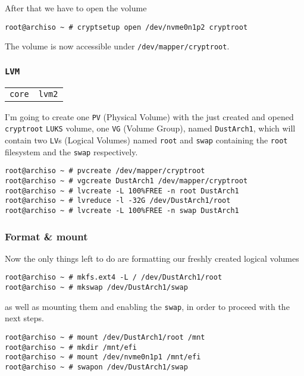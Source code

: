 \documentclass[9pt]{report}
\newenvironment{packagetable}
{\begin{longtabu}to \textwidth [b]{X[1,r]|X[1,l]}}
{\end{longtabu}}
\begin{document}
After that we have to open the volume


\begin{verbatim}
root@archiso ~ # cryptsetup open /dev/nvme0n1p2 cryptroot
\end{verbatim}

The volume is now accessible under \texttt{/dev/mapper/cryptroot}.



\newpage

\hypertarget{x-lvm}{\subsubsection{\texttt{LVM}}}
\begin{packagetable}
    \texttt{core} & \texttt{lvm2} \\ 
\end{packagetable}

I’m going to create one \texttt{PV} (Physical Volume) with the just created and opened \texttt{cryptroot} \texttt{LUKS} volume, one \texttt{VG} (Volume Group), named \texttt{DustArch1}, which will contain two \texttt{LV}s (Logical Volumes) named \texttt{root} and \texttt{swap} containing the \texttt{root} filesystem and the \texttt{swap} respectively.


\begin{verbatim}
root@archiso ~ # pvcreate /dev/mapper/cryptroot
root@archiso ~ # vgcreate DustArch1 /dev/mapper/cryptroot
root@archiso ~ # lvcreate -L 100%FREE -n root DustArch1
root@archiso ~ # lvreduce -l -32G /dev/DustArch1/root
root@archiso ~ # lvcreate -L 100%FREE -n swap DustArch1
\end{verbatim}


\newpage

\hypertarget{x-format-and-mount}{\subsubsection{Format \& mount}}
Now the only things left to do are formatting our freshly created logical volumes


\begin{verbatim}
root@archiso ~ # mkfs.ext4 -L / /dev/DustArch1/root
root@archiso ~ # mkswap /dev/DustArch1/swap
\end{verbatim}

as well as mounting them and enabling the \texttt{swap}, in order to proceed with the next steps.


\begin{verbatim}
root@archiso ~ # mount /dev/DustArch1/root /mnt
root@archiso ~ # mkdir /mnt/efi
root@archiso ~ # mount /dev/nvme0n1p1 /mnt/efi
root@archiso ~ # swapon /dev/DustArch1/swap
\end{verbatim}
\end{document}
